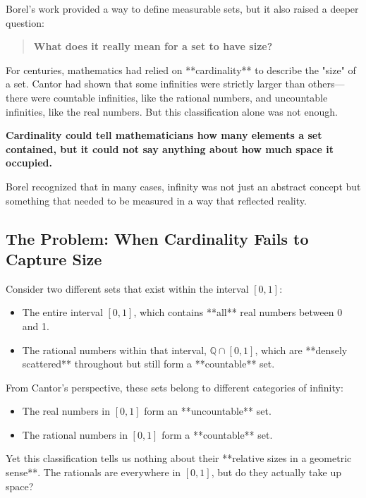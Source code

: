 Borel’s work provided a way to define measurable sets, but it also raised a deeper question: 

\begin{quote}
\textbf{What does it really mean for a set to have size?}
\end{quote}

For centuries, mathematics had relied on **cardinality** to describe the "size" of a set. Cantor had shown that some infinities were strictly larger than others—there were countable infinities, like the rational numbers, and uncountable infinities, like the real numbers. But this classification alone was not enough. 

\textbf{Cardinality could tell mathematicians how many elements a set contained, but it could not say anything about how much space it occupied.} 

Borel recognized that in many cases, infinity was not just an abstract concept but something that needed to be measured in a way that reflected reality.

\subsection{The Problem: When Cardinality Fails to Capture Size}

Consider two different sets that exist within the interval \( [0,1] \):

\begin{itemize}
    \item The entire interval \( [0,1] \), which contains **all** real numbers between 0 and 1.
    \item The rational numbers within that interval, \( \mathbb{Q} \cap [0,1] \), which are **densely scattered** throughout but still form a **countable** set.
\end{itemize}

From Cantor’s perspective, these sets belong to different categories of infinity:

\begin{itemize}
    \item The real numbers in \( [0,1] \) form an **uncountable** set.
    \item The rational numbers in \( [0,1] \) form a **countable** set.
\end{itemize}

Yet this classification tells us nothing about their **relative sizes in a geometric sense**. The rationals are everywhere in \( [0,1] \), but do they actually take up space? 


